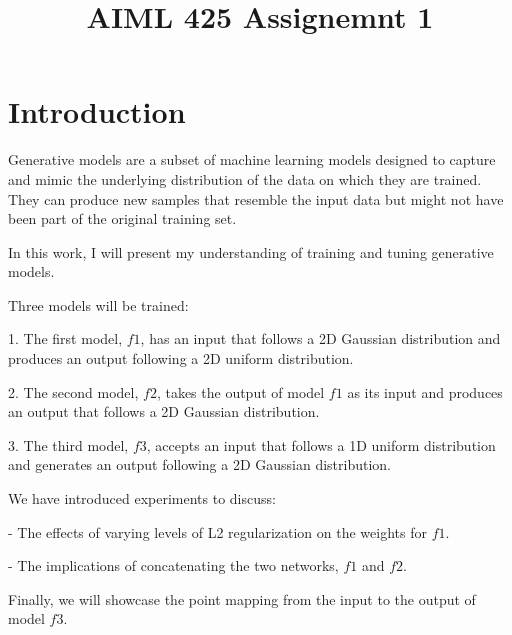 \documentclass{article}
\title{AIML 425 Assignemnt 1}
\begin{document}
%
\maketitle
%
\section{Introduction}
\label{sec:intro}

Generative models are a subset of machine learning models designed to capture and mimic the underlying distribution of the data on which they are trained. They can produce new samples that resemble the input data but might not have been part of the original training set.

In this work, I will present my understanding of training and tuning generative models.

Three models will be trained:

1. The first model, $f1$, has an input that follows a 2D Gaussian distribution and produces an output following a 2D uniform distribution.

2. The second model, $f2$, takes the output of model $f1$ as its input and produces an output that follows a 2D Gaussian distribution.

3. The third model, $f3$, accepts an input that follows a 1D uniform distribution and generates an output following a 2D Gaussian distribution.

We have introduced experiments to discuss:

  - The effects of varying levels of L2 regularization on the weights for $f1$.
  
  - The implications of concatenating the two networks, $f1$ and $f2$.

Finally, we will showcase the point mapping from the input to the output of model $f3$.
\end{document}
